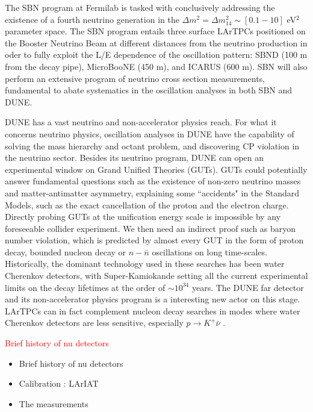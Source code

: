 The SBN program at Fermilab is tasked with conclusively addressing the existence of a fourth neutrino generation in the  $\Delta m^2= \Delta m^2_{14} \sim [0.1 - 10]$ eV$^2$ parameter space. The SBN program entails three surface LArTPCs positioned on the Booster Neutrino Beam at different distances from the neutrino production in oder to fully exploit  the L/E dependence of the oscillation pattern:  SBND (100 m from the decay pipe), MicroBooNE (450 m), and ICARUS (600 m). SBN will also perform an extensive 
program of neutrino cross section measurements, fundamental to abate systematics in the oscillation analyses in both SBN and DUNE.

DUNE has a vast neutrino and non-accelerator physics reach. For what it concerns neutrino physics, oscillation analyses in DUNE have the capability of solving the mass hierarchy and octant problem,  and discovering CP violation in the neutrino sector. Besides its neutrino program, DUNE can open an experimental window on Grand Unified Theories (GUTs). GUTs could potentially answer fundamental questions such as the existence of non-zero neutrino masses and matter-antimatter asymmetry, explaining some ``accidents" in the Standard Models, such as the exact cancellation of the  proton and the electron charge.   Directly probing GUTs at the unification energy scale is impossible by any foreseeable collider experiment. We then need an indirect proof such as baryon number violation, which is predicted by almost every GUT in the form of proton decay, bounded nucleon decay or $n-\bar n$ oscillations on long time-scales. Historically, the dominant technology used in these searches has been water Cherenkov detectors, with Super-Kamiokande setting all the current experimental limits on the decay lifetimes at the order of $\sim 10 ^{34}$ years. The DUNE far detector and its non-accelerator physics program is a interesting new actor on this stage.  LArTPCs can in fact complement nucleon decay searches in modes where water Cherenkov detectors are less sensitive, especially $p\rightarrow K^+\bar{\nu}$  \cite{Adams:2013qkq}.



\textcolor{red}{Brief history of nu detectors}

\begin{itemize}
\item Brief history of nu detectors
\item Calibration : LArIAT
\item The measurements
\end{itemize}



